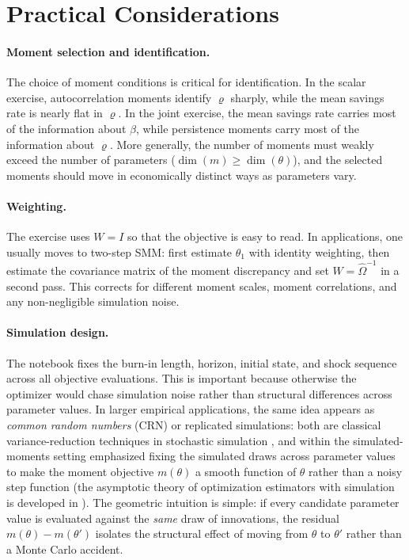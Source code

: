 \documentclass[11pt,a4paper]{report}
\begin{document}
\section{Practical Considerations}

\paragraph{Moment selection and identification.}  The choice of moment conditions is critical for identification.  In the scalar exercise, autocorrelation moments identify $\varrho$ sharply, while the mean savings rate is nearly flat in $\varrho$.  In the joint exercise, the mean savings rate carries most of the information about $\beta$, while persistence moments carry most of the information about $\varrho$.  More generally, the number of moments must weakly exceed the number of parameters ($\dim(m)\geq\dim(\theta)$), and the selected moments should move in economically distinct ways as parameters vary.

\paragraph{Weighting.}  The exercise uses $W=I$ so that the objective is easy to read.  In applications, one usually moves to two-step SMM: first estimate $\hat{\theta}_1$ with identity weighting, then estimate the covariance matrix of the moment discrepancy and set $W=\hat{\Omega}^{-1}$ in a second pass.  This corrects for different moment scales, moment correlations, and any non-negligible simulation noise.

\paragraph{Simulation design.}  The notebook fixes the burn-in length, horizon, initial state, and shock sequence across all objective evaluations.  This is important because otherwise the optimizer would chase simulation noise rather than structural differences across parameter values.  In larger empirical applications, the same idea appears as \emph{common random numbers} (CRN) or replicated simulations: both are classical variance-reduction techniques in stochastic simulation \citep{glasserman2004monte}, and within the simulated-moments setting \citet{mcfadden1989method} emphasized fixing the simulated draws across parameter values to make the moment objective $m(\theta)$ a smooth function of $\theta$ rather than a noisy step function (the asymptotic theory of optimization estimators with simulation is developed in \citet{pakes1989simulation}).  The geometric intuition is simple: if every candidate parameter value is evaluated against the \emph{same} draw of innovations, the residual $m(\theta) - m(\theta')$ isolates the structural effect of moving from $\theta$ to $\theta'$ rather than a Monte Carlo accident.
\end{document}
